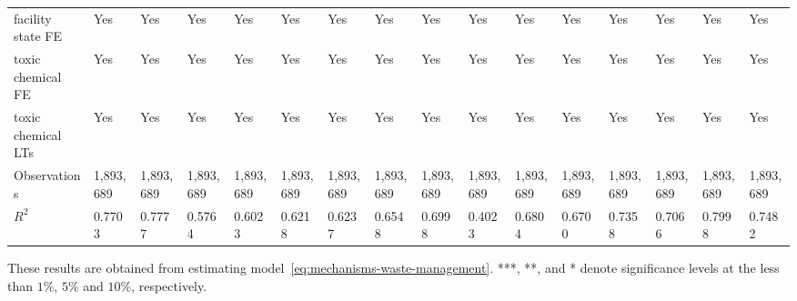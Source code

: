 \begin{table}[H]
{\begin{tabular}{@{}llllllllllllllll@{}}
            facility state FE  & Yes       & Yes       & Yes       & Yes        & Yes       & Yes       & Yes       & Yes             & Yes       & Yes       & Yes       & Yes       & Yes       & Yes            & Yes              \\
            toxic chemical FE  & Yes       & Yes       & Yes       & Yes        & Yes       & Yes       & Yes       & Yes             & Yes       & Yes       & Yes       & Yes       & Yes       & Yes            & Yes              \\
            toxic chemical LTs & Yes       & Yes       & Yes       & Yes        & Yes       & Yes       & Yes       & Yes             & Yes       & Yes       & Yes       & Yes       & Yes       & Yes            & Yes              \\ \midrule \midrule
            Observations       & 1,893,689 & 1,893,689 & 1,893,689 & 1,893,689  & 1,893,689 & 1,893,689 & 1,893,689 & 1,893,689       & 1,893,689 & 1,893,689 & 1,893,689 & 1,893,689 & 1,893,689 & 1,893,689      & 1,893,689        \\
            $R^2$              & 0.7703    & 0.7777    & 0.5764    & 0.6023     & 0.6218    & 0.6237    & 0.6548    & 0.6998          & 0.4023    & 0.6804    & 0.6700    & 0.7358    & 0.7066    & 0.7998         & 0.7482           \\ \bottomrule \bottomrule
        \end{tabular}%
    }
    \begin{minipage}{18cm}
        \vspace{0.05in}
        These results are obtained from estimating model~\ref{eq:mechanisms-waste-management}. ***, **, and * denote significance levels at the less than $1\%$, $5\%$ and $10\%$, respectively.
    \end{minipage}
\end{table}